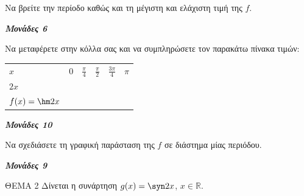 \documentclass[11pt,a4paper,twoside]{book}
\newcommand{\monades}[1]{
\hspace*{\fill}
\textbf{\textit{\textcolor{maincolor}{Μονάδες #1}}}}
\begin{document}
\begin{alist}
\item Να βρείτε την περίοδο καθώς και τη μέγιστη και ελάχιστη τιμή της $f$.
\monades{6}
\item
\begin{rlist}
\item Να μεταφέρετε στην κόλλα σας και να συμπληρώσετε τον παρακάτω πίνακα τιμών:
\begin{longtable}[]{@{}
  >{\centering\arraybackslash}p{}
  >{\centering\arraybackslash}p{}
  >{\centering\arraybackslash}p{}
  >{\centering\arraybackslash}p{}
  >{\centering\arraybackslash}p{}
  >{\centering\arraybackslash}p{}@{}}
\noalign{}
\begin{minipage}[b]{\linewidth}\centering
$x$
\end{minipage} & \begin{minipage}[b]{\linewidth}\centering
$0$
\end{minipage} & \begin{minipage}[b]{\linewidth}\centering
$\frac{\pi}{4}$
\end{minipage} & \begin{minipage}[b]{\linewidth}\centering
$\frac{\pi}{2}$
\end{minipage} & \begin{minipage}[b]{\linewidth}\centering
$\frac{3\pi}{4}$
\end{minipage} & \begin{minipage}[b]{\linewidth}\centering
$\pi$
\end{minipage} \\
\noalign{}
\noalign{}
\endlastfoot
$2x$ & & & & & \\
$f(x) = \hm  2x$ & & & & & \\
\end{longtable}
\monades{10}
\item Να σχεδιάσετε τη γραφική παράσταση της $f$ σε διάστημα μίας περιόδου.
\monades{9}
\end{rlist}
\end{alist}
ΘEMA 2
Δίνεται η συνάρτηση $g(x) = \syn  2x$, $x \in \mathbb{R}$.
\end{document}
